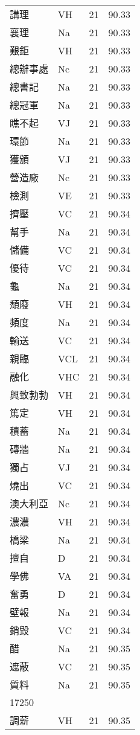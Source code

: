 \documentclass[twocolumn]{book}
\begin{document}
\begin{supertabular}{llrr}
講理 & VH & 21 &  90.33\\
襄理 & Na & 21 &  90.33\\
艱鉅 & VH & 21 &  90.33\\
總辦事處 & Nc & 21 &  90.33\\
總書記 & Na & 21 &  90.33\\
總冠軍 & Na & 21 &  90.33\\
瞧不起 & VJ & 21 &  90.33\\
環節 & Na & 21 &  90.33\\
獲頒 & VJ & 21 &  90.33\\
營造廠 & Nc & 21 &  90.33\\
檢測 & VE & 21 &  90.33\\
擠壓 & VC & 21 &  90.34\\
幫手 & Na & 21 &  90.34\\
儲備 & VC & 21 &  90.34\\
優待 & VC & 21 &  90.34\\
龜 & Na & 21 &  90.34\\
頹廢 & VH & 21 &  90.34\\
頻度 & Na & 21 &  90.34\\
輸送 & VC & 21 &  90.34\\
親臨 & VCL & 21 &  90.34\\
融化 & VHC & 21 &  90.34\\
興致勃勃 & VH & 21 &  90.34\\
篤定 & VH & 21 &  90.34\\
積蓄 & Na & 21 &  90.34\\
磚牆 & Na & 21 &  90.34\\
獨占 & VJ & 21 &  90.34\\
燒出 & VC & 21 &  90.34\\
澳大利亞 & Nc & 21 &  90.34\\
濃濃 & VH & 21 &  90.34\\
橋梁 & Na & 21 &  90.34\\
擅自 & D & 21 &  90.34\\
學佛 & VA & 21 &  90.34\\
奮勇 & D & 21 &  90.34\\
壁報 & Na & 21 &  90.34\\
銷毀 & VC & 21 &  90.34\\
醋 & Na & 21 &  90.35\\
遮蔽 & VC & 21 &  90.35\\
質料 & Na & 21 &  90.35\\
17250\\
調薪 & VH & 21 &  90.35\\

\end{supertabular}
\end{document}

